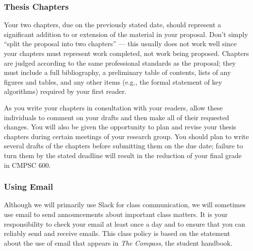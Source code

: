 \documentclass[11pt]{article}
\begin{document}
\subsubsection*{Thesis Chapters}

Your two chapters, due on the previously stated date, should represent a
significant addition to or extension of the material in your proposal. Don't
simply ``split the proposal into two chapters'' --- this usually does not work
well since your chapters must represent work completed, not work being proposed.
Chapters are judged according to the same professional standards as the
proposal; they must include a full bibliography, a preliminary table of
contents, lists of any figures and tables, and any other items (e.g., the formal
statement of key algorithms) required by your first reader.

As you write your chapters in consultation with your readers, allow these
individuals to comment on your drafts and then make all of their requested
changes. You will also be given the opportunity to plan and revise your thesis
chapters during certain meetings of your research group. You should plan to
write several drafts of the chapters before submitting them on the due date;
failure to turn them by the stated deadline will result in the reduction of your
final grade in CMPSC 600.



\subsubsection*{Using Email}

Although we will primarily use Slack for class communication, we will sometimes
use email to send announcements about important class matters. It is your
responsibility to check your email at least once a day and to ensure that you
can reliably send and receive emails. This class policy is based on the
statement about the use of email that appears in {\em The Compass}, the student
handbook.
\end{document}
